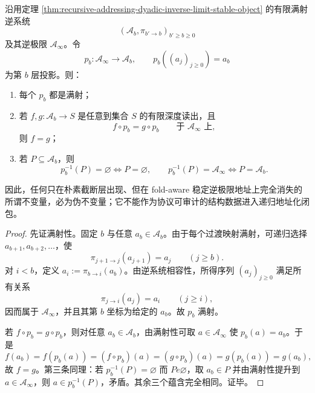 \begin{theorem}[稳定逆系统中的伪不变量剔除]\label{distill:wang_zahl-sticky_reduction_and_scale_saturated_closure-stable-inverse-limit-pseudoinvariant-elimination}
沿用定理 \ref{thm:recursive-addressing-dyadic-inverse-limit-stable-object} 的有限满射逆系统
\[
(\mathcal A_b,\pi_{b'\to b})_{b'\ge b\ge0}
\]
及其逆极限 \(\mathcal A_\infty\)。令
\[
p_b:\mathcal A_\infty\to\mathcal A_b,
\qquad
p_b((a_j)_{j\ge0})=a_b
\]
为第 \(b\) 层投影。则：
\begin{enumerate}
  \item 每个 \(p_b\) 都是满射；
  \item 若 \(f,g:\mathcal A_b\to S\) 是任意到集合 \(S\) 的有限深度读出，且
  \[
  f\circ p_b=g\circ p_b
  \qquad\text{于 }\mathcal A_\infty\text{ 上},
  \]
  则 \(f=g\)；
  \item 若 \(P\subseteq\mathcal A_b\)，则
  \[
  p_b^{-1}(P)=\varnothing\Longleftrightarrow P=\varnothing,
  \qquad
  p_b^{-1}(P)=\mathcal A_\infty\Longleftrightarrow P=\mathcal A_b.
  \]
\end{enumerate}
因此，任何只在朴素截断层出现、但在 fold-aware 稳定逆极限地址上完全消失的所谓不变量，必为伪不变量；它不能作为协议可审计的结构数据进入递归地址化闭包。
\end{theorem}
\begin{proof}
先证满射性。固定 \(b\) 与任意 \(a_b\in\mathcal A_b\)。由于每个过渡映射满射，可递归选择 \(a_{b+1},a_{b+2},\ldots\)，使
\[
\pi_{j+1\to j}(a_{j+1})=a_j
\qquad(j\ge b).
\]
对 \(i<b\)，定义 \(a_i:=\pi_{b\to i}(a_b)\)。由逆系统相容性，所得序列 \((a_j)_{j\ge0}\) 满足所有关系
\[
\pi_{j\to i}(a_j)=a_i
\qquad(j\ge i),
\]
因而属于 \(\mathcal A_\infty\)，并且其第 \(b\) 坐标为给定的 \(a_b\)。故 \(p_b\) 满射。

若 \(f\circ p_b=g\circ p_b\)，则对任意 \(a_b\in\mathcal A_b\)，由满射性可取 \(a\in\mathcal A_\infty\) 使 \(p_b(a)=a_b\)。于是
\[
f(a_b)=f(p_b(a))=(f\circ p_b)(a)=(g\circ p_b)(a)=g(p_b(a))=g(a_b),
\]
故 \(f=g\)。第三条同理：若 \(p_b^{-1}(P)=\varnothing\) 而 \(P
e\varnothing\)，取 \(a_b\in P\) 并由满射性提升到 \(a\in\mathcal A_\infty\)，则 \(a\in p_b^{-1}(P)\)，矛盾。其余三个蕴含完全相同。证毕。
\end{proof}

